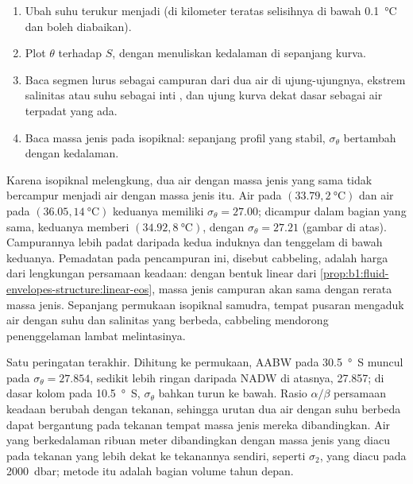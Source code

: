 \begin{method}\label{met:b1:fluid-envelopes-structure:ts}
\begin{enumerate}
  \item Ubah suhu terukur menjadi  (di kilometer teratas selisihnya
        di bawah \qty{0.1}{\celsius} dan boleh diabaikan).
  \item Plot $\theta$ terhadap $S$, dengan menuliskan kedalaman di sepanjang kurva.
  \item Baca segmen lurus sebagai campuran dari dua air di ujung-ujungnya, ekstrem
        salinitas atau suhu sebagai inti , dan ujung kurva dekat dasar
        sebagai air terpadat yang ada.
  \item Baca massa jenis pada isopiknal: sepanjang profil yang stabil, $\sigma_\theta$
        bertambah dengan kedalaman.
\end{enumerate}
\end{method}

Karena isopiknal melengkung, dua air dengan massa jenis yang sama tidak bercampur menjadi
air dengan massa jenis itu. Air pada $(33.79, \qty{2}{\celsius})$ dan air pada
$(36.05, \qty{14}{\celsius})$ keduanya memiliki $\sigma_\theta = 27.00$; dicampur
dalam bagian yang sama, keduanya memberi $(34.92, \qty{8}{\celsius})$, dengan
$\sigma_\theta = 27.21$ (gambar di atas). Campurannya lebih padat daripada kedua
induknya dan tenggelam di bawah keduanya. Pemadatan pada pencampuran ini, disebut
cabbeling, adalah harga dari lengkungan persamaan keadaan: dengan bentuk linear dari
\cref{prop:b1:fluid-envelopes-structure:linear-eos}, massa jenis campuran akan sama dengan
rerata massa jenis. Sepanjang permukaan isopiknal samudra, tempat pusaran mengaduk air
dengan suhu dan salinitas yang berbeda, cabbeling mendorong penenggelaman lambat
melintasinya.

Satu peringatan terakhir. Dihitung ke permukaan, AABW pada \qty{30.5}{\degree S}
muncul pada $\sigma_\theta = 27.854$, sedikit lebih ringan daripada NADW di atasnya,
\num{27.857}; di dasar kolom pada \qty{10.5}{\degree S}, $\sigma_\theta$ bahkan turun
ke bawah. Rasio $\alpha/\beta$ persamaan keadaan berubah dengan tekanan, sehingga
urutan dua air dengan suhu berbeda dapat bergantung pada tekanan tempat massa jenis mereka
dibandingkan. Air yang berkedalaman ribuan meter dibandingkan dengan massa jenis yang
diacu pada tekanan yang lebih dekat ke tekanannya sendiri, seperti $\sigma_2$, yang
diacu pada \qty{2000}{dbar}; metode itu adalah bagian volume tahun depan.


